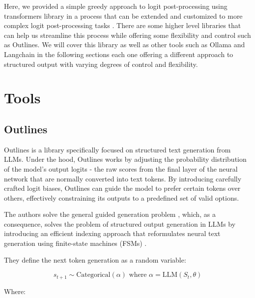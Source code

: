 Here, we provided a simple greedy approach to logit post-processing using transformers library in a process that can be extended and customized to more complex logit post-processing tasks . There are some higher level libraries that can help us streamline this process while offering some flexibility and control such as Outlines. We will cover this library as well as other tools such as Ollama and Langchain in the following sections each one offering a different approach to structured output with varying degrees of control and flexibility.

\section{Tools}

\subsection{Outlines}

Outlines  is a library specifically focused on structured text generation from LLMs. Under the hood, Outlines works by adjusting the probability distribution of the model's output logits - the raw scores from the final layer of the neural network that are normally converted into text tokens. By introducing carefully crafted logit biases, Outlines can guide the model to prefer certain tokens over others, effectively constraining its outputs to a predefined set of valid options.

The authors solve the general guided generation problem , which, as a consequence, solves the problem of structured output generation in LLMs by introducing an efficient indexing approach that reformulates neural text generation using finite-state machines (FSMs) .

They define the next token generation as a random variable:

\[s_{t+1} \sim \text{Categorical}(\alpha) \text{ where } \alpha = \text{LLM}(S_t, \theta)\]

Where:


